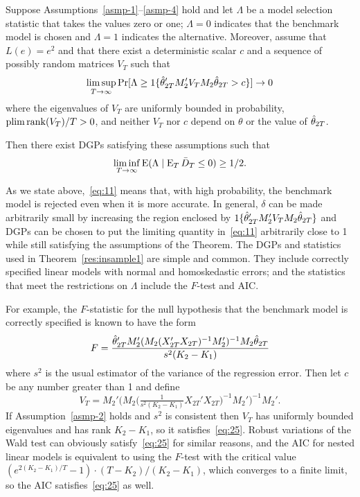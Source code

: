 \begin{thm}\label{res:insample1}
  Suppose Assumptions~\ref{asmp-1}--\ref{asmp-4} hold and let
  $\Lambda$ be a model selection statistic that takes the values zero
  or one; $\Lambda = 0$ indicates that the benchmark model is chosen
  and $\Lambda = 1$ indicates the alternative.  Moreover, assume that
  $L(e) = e^2$ and that there exist a deterministic scalar $c$
  and a sequence of possibly random matrices $V_T$ such that
  \begin{equation}\label{eq:25}
    \limsup_{T \to \infty}
    \Pr[\Lambda \geq \operatorname{1}\{\hat\theta_{2T}'M_2' V_T M_2\hat\theta_{2T} > c \}]
    \to 0
  \end{equation}
  where the eigenvalues of $V_T$ are uniformly bounded in probability,
  $\operatorname*{plim} \operatorname*{rank}(V_T)/T > 0$, and neither $V_T$ nor $c$ depend on
  $\theta$ or the value of $\hat\theta_{2T}$.

  Then there exist DGPs satisfying these assumptions such that
  \begin{equation}\label{eq:11}
    \liminf_{T \to \infty} \operatorname{E}( \Lambda \mid \operatorname{E}_T \bar{D}_{T} \leq 0 ) \geq 1/2.
  \end{equation}
\end{thm}

As we state above,~\eqref{eq:11} means that, with high probability,
the benchmark model is rejected even when it is more accurate. In
general, $\delta$ can be made arbitrarily small by increasing the
region enclosed by $\operatorname{1}\{\hat\theta_{2T}'M_2' V_T M_2\hat\theta_{2T}\}$ and DGPs can be
chosen to put the limiting quantity in~\eqref{eq:11}
arbitrarily close to 1 while still satisfying
the assumptions of the Theorem.  The DGPs and
statistics used in Theorem~\ref{res:insample1} are simple and
common. They include correctly specified linear models with normal and
homoskedastic errors; and the statistics that meet the restrictions on
$\Lambda$ include the $F$-test and AIC.

For example, the $F$-statistic for the null hypothesis that the
benchmark model is correctly specified is known to have the form
\begin{equation*}
  F = \frac{\hat\theta_{2T}' M_2' ( M_2 (X_{2T}'X_{2T})^{-1} M_2' )^{-1} M_2
    \hat\theta_{2T}}{s^2 (K_2 - K_1)}
\end{equation*}
where $s^2$ is the usual estimator of the variance of the regression
error. Then let $c$ be any number greater than 1 and define
\begin{equation*}
  V_T = M_2' \big( M_2 \big(\tfrac{1}{s^2 (K_2 - K_1)} X_{2T}'X_{2T}\big)^{-1}
  M_2' \big)^{-1} M_2'.
\end{equation*}
If Assumption~\ref{asmp-2} holds and $s^2$ is consistent then $V_T$
has uniformly bounded eigenvalues and has rank $K_2 - K_1$, so it
satisfies~\eqref{eq:25}.
Robust variations of the Wald test can obviously satisfy~\eqref{eq:25}
for similar reasons, and the AIC for nested linear models is
equivalent to using the $F$-test with the critical value %
$(e^{2 (K_2 - K_1) / T} - 1) \cdot (T - K_2) / (K_2 - K_1)$, %
which converges to a finite limit, so the AIC satisfies~\eqref{eq:25}
as well.

